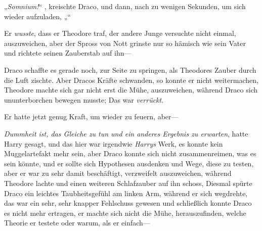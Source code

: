 \later

„\emph{Somnium!}“ , kreischte Draco, und dann, nach zu wenigen Sekunden, um sich wieder aufzuladen, „“

Er \emph{wusste}, dass er Theodore traf, der andere Junge versuchte nicht einmal, auszuweichen, aber der Spross von Nott grinste nur so hämisch wie sein Vater und richtete seinen Zauberstab auf ihn—

Draco schaffte es gerade noch, zur Seite zu springen, als Theodores Zauber durch die Luft zischte. Aber Dracos Kräfte schwanden, so konnte er nicht weitermachen, Theodore machte sich gar nicht erst die Mühe, auszuweichen, während Draco sich ununterborchen bewegen musste; Das war \emph{verrückt}.

Er hatte jetzt genug Kraft, um wieder zu feuern, aber—

\emph{Dummheit ist, das Gleiche zu tun und ein anderes Ergebnis zu erwarten}, hatte Harry gesagt, und das hier war irgendwie \emph{Harrys} Werk, es konnte kein Muggelartefakt mehr sein, aber Draco konnte sich nicht zusammenreimen, was es sein könnte, und er sollte sich Hypothesen ausdenken und Wege, diese zu testen, aber er war zu sehr damit beschäftigt, verzweifelt auszuweichen, während Theodore lachte und einen weiteren Schlafzauber auf ihn schoss, Diesmal spürte Draco ein leichtes Taubheitsgefühl am linken Arm, während er sich wegdrehte, das war ein sehr, sehr knapper Fehlschuss gewesen und schließlich konnte Draco es nicht mehr ertragen, er machte sich nicht die Mühe, herauszufinden, welche Theorie er testete oder warum, als er einfach—

